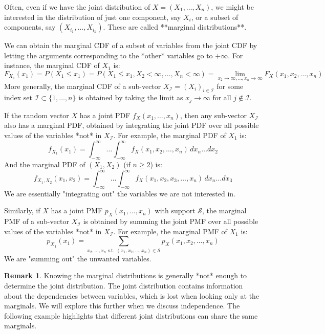 \documentclass[11pt, a4paper]{article}
\theoremstyle{definition} %
\newtheorem{remark}[theorem]{Remark}
\begin{document}
Often, even if we have the joint distribution of $X = (X_1, \dots, X_n)$, we might be interested in the distribution of just one component, say $X_i$, or a subset of components, say $(X_{i_1}, \dots, X_{i_k})$. These are called **marginal distributions**.

We can obtain the marginal CDF of a subset of variables from the joint CDF by letting the arguments corresponding to the *other* variables go to $+\infty$. For instance, the marginal CDF of $X_1$ is:
\[ F_{X_1}(x_1) = P(X_1 \le x_1) = P(X_1 \le x_1, X_2 < \infty, \dots, X_n < \infty) = \lim_{x_2 \to \infty, \dots, x_n \to \infty} F_X(x_1, x_2, \dots, x_n) \]
More generally, the marginal CDF of a sub-vector $X_{\mathcal{I}} = (X_i)_{i \in \mathcal{I}}$ for some index set $\mathcal{I} \subset \{1, \dots, n\}$ is obtained by taking the limit as $x_j \to \infty$ for all $j \notin \mathcal{I}$.

If the random vector $X$ has a joint PDF $f_X(x_1, \dots, x_n)$, then any sub-vector $X_{\mathcal{I}}$ also has a marginal PDF, obtained by integrating the joint PDF over all possible values of the variables *not* in $X_{\mathcal{I}}$. For example, the marginal PDF of $X_1$ is:
\[ f_{X_1}(x_1) = \int_{-\infty}^{\infty} \dots \int_{-\infty}^{\infty} f_X(x_1, x_2, \dots, x_n) \, dx_n \dots dx_2 \]
And the marginal PDF of $(X_1, X_2)$ (if $n \ge 2$) is:
\[ f_{X_1, X_2}(x_1, x_2) = \int_{-\infty}^{\infty} \dots \int_{-\infty}^{\infty} f_X(x_1, x_2, x_3, \dots, x_n) \, dx_n \dots dx_3 \]
We are essentially "integrating out" the variables we are not interested in.

Similarly, if $X$ has a joint PMF $p_X(x_1, \dots, x_n)$ with support $\mathcal{S}$, the marginal PMF of a sub-vector $X_{\mathcal{I}}$ is obtained by summing the joint PMF over all possible values of the variables *not* in $X_{\mathcal{I}}$. For example, the marginal PMF of $X_1$ is:
\[ p_{X_1}(x_1) = \sum_{x_2, \dots, x_n \text{ s.t. } (x_1, x_2, \dots, x_n) \in \mathcal{S}} p_X(x_1, x_2, \dots, x_n) \]
We are "summing out" the unwanted variables.

\begin{remark}
Knowing the marginal distributions is generally *not* enough to determine the joint distribution. The joint distribution contains information about the dependencies between variables, which is lost when looking only at the marginals. We will explore this further when we discuss independence. The following example highlights that different joint distributions can share the same marginals.
\end{remark}
\end{document}
